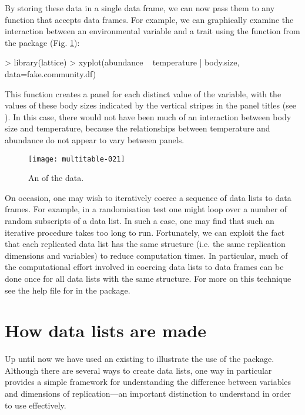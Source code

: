 \documentclass[a4paper]{report}
\begin{document}
\begin{article}
By storing these data in a single data frame, we can now pass them to any function that accepts data frames.  For example, we can graphically examine the interaction between an environmental variable and a trait using the  function from the  package (Fig. \ref{fig:xyplot}):
\begin{Schunk}
\begin{Sinput}
> library(lattice)
> xyplot(abundance ~ temperature | body.size,
   data=fake.community.df)
\end{Sinput}
\end{Schunk}
This function creates a panel for each distinct value of the  variable, with the values of these body sizes indicated by the vertical stripes in the panel titles (see ).  In this case, there would not have been much of an interaction between body size and temperature, because the relationships between temperature and abundance do not appear to vary between panels.
\begin{figure}
\texttt{[image: multitable-021]}
\caption{An  of the  data.}
\label{fig:xyplot}
\end{figure}

On occasion, one may wish to iteratively coerce a sequence of data lists to data frames.  For example, in a randomisation test one might loop over a number of random subscripts of a data list.  In such a case, one may find that such an iterative procedure takes too long to run.  Fortunately, we can exploit the fact that each replicated data list has the same structure (i.e. the same replication dimensions and variables) to reduce computation times.  In particular, much of the computational effort involved in coercing data lists to data frames can be done once for all data lists with the same structure.  For more on this technique see the help file for  in the  package.

\section{How data lists are made}

Up until now we have used an existing  to illustrate the use of the  package.  Although there are several ways to create data lists, one way in particular provides a simple framework for understanding the difference between variables and dimensions of replication---an important distinction to understand in order to use  effectively.


\end{article}
\end{document}
